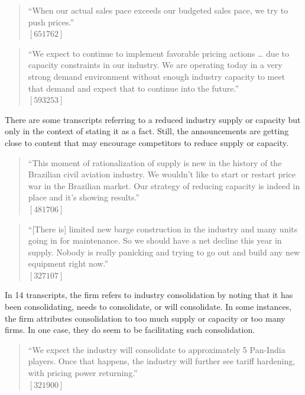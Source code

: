 \begin{quote}
``When our actual sales pace exceeds our budgeted sales pace, we try to push prices.'' \\
$[651762]$
\end{quote}

\begin{quote}
``We expect to continue to implement favorable pricing actions … due to capacity constraints in our industry. We are operating today in a very strong demand environment without enough industry capacity to meet that demand and expect that to continue into the future.'' \\
$[593253]$
\end{quote}

There are some transcripts referring to a reduced industry supply or capacity but only in the context of stating it as a fact. Still, the announcements are getting close to content that may encourage competitors to reduce supply or capacity.

\begin{quote}
``This moment of rationalization of supply is new in the history of the Brazilian civil aviation industry. We wouldn't like to start or restart price war in the Brazilian market. Our strategy of reducing capacity is indeed in place and it's showing results.'' \\
$[481706]$
\end{quote}

\begin{quote}
``[There is] limited new barge construction in the industry and many units going in for maintenance. So we should have a net decline this year in supply. Nobody is really panicking and trying to go out and build any new equipment right now.'' \\
$[327107]$
\end{quote}

In 14 transcripts, the firm refers to industry consolidation by noting that it has been consolidating, needs to consolidate, or will consolidate. In some instances, the firm attributes consolidation to too much supply or capacity or too many firms. In one case, they do seem to be facilitating such consolidation.

\begin{quote}
``We expect the industry will consolidate to approximately 5 Pan-India players. Once that happens, the industry will further see tariff hardening, with pricing power returning.'' \\
$[321900]$
\end{quote}

